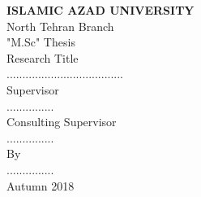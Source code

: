 
\thispagestyle{empty}

\begin{center}
	
	\begin{latin}
		
		{\LARGE \bf ISLAMIC AZAD UNIVERSITY}
		\\[1cm]
		{\Large North Tehran Branch}
		\\[1cm]
		{\Large "M.Sc" Thesis}
		\\[2cm]
		
		{\Large Research Title}
		\\[.5cm]
		{.....................................}
		\\[1cm]
		{\Large Supervisor}
		\\[.5cm]
		{...............}
		\\[1cm]
		{\Large Consulting Supervisor}
		\\[.5cm]
		{...............}
		\\[1cm]
		{\Large By}
		\\[.5cm]
		{...............}
		\\[1cm]
		Autumn 2018
		
	\end{latin}
\end{center}
